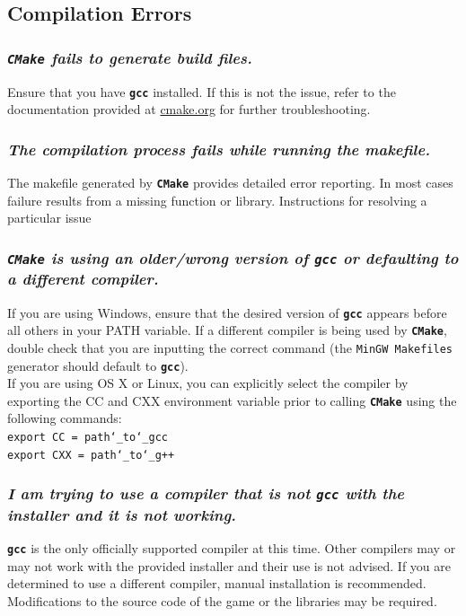 \documentclass[12pt, titlepage]{article}
\begin{document}
\subsection{Compilation Errors}
\subsubsection{\emph{\texttt{CMake} fails to generate build files.}}
\noindent Ensure that you have \texttt{\bf gcc} installed.  If this is not the issue, refer to the documentation provided at \href{http://www.cmake.org}{cmake.org} for further troubleshooting.

\subsubsection{\emph{The compilation process fails while running the makefile.}}
\noindent The makefile generated by \texttt{\bf CMake} provides detailed error reporting.  In most cases failure results from a missing function or library.  Instructions for resolving a particular issue 

\subsubsection{\emph{\texttt{CMake} is using an older/wrong version of \texttt{\bf gcc} or defaulting to a different compiler.}}
\noindent If you are using Windows, ensure that the desired version of \texttt{\bf gcc} appears before all others in your PATH variable.  If a different compiler is being used by \texttt{\bf CMake}, double check that you are inputting the correct command (the \texttt{MinGW Makefiles} generator should default to \texttt{\bf gcc}).\\

\noindent If you are using OS X or Linux, you can explicitly select the compiler by exporting the CC and CXX environment variable prior to calling \texttt{\bf CMake} using the following commands:\\

\noindent \qquad \texttt{export CC = path\char`_to\char`_gcc}\\
${}$\noindent \qquad \texttt{export CXX = path\char`_to\char`_g++}


\subsubsection{\emph{I am trying to use a compiler that is not \texttt{gcc} with the installer and it is not working.}}
\noindent \texttt{\bf gcc} is the only officially supported compiler at this time.  Other compilers may or may not work with the provided installer and their use is not advised.  If you are determined to use a different compiler, manual installation is recommended.  Modifications to the source code of the game or the libraries may be required.
\end{document}
